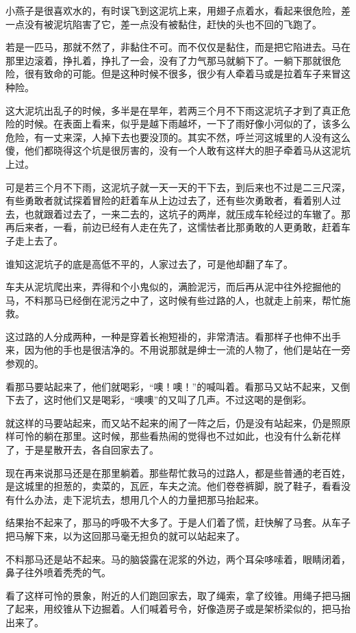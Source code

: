 \par 小燕子是很喜欢水的，有时误飞到这泥坑上来，用翅子点着水，看起来很危险，差一点没有被泥坑陷害了它，差一点没有被黏住，赶快的头也不回的飞跑了。
\par 若是一匹马，那就不然了，非黏住不可。而不仅仅是黏住，而是把它陷进去。马在那里边滚着，挣扎着，挣扎了一会，没有了力气那马就躺下了。一躺下那就很危险，很有致命的可能。但是这种时候不很多，很少有人牵着马或是拉着车子来冒这种险。
\par 这大泥坑出乱子的时候，多半是在旱年，若两三个月不下雨这泥坑子才到了真正危险的时候。在表面上看来，似乎是越下雨越坏，一下了雨好像小河似的了，该多么危险，有一丈来深，人掉下去也要没顶的。其实不然，呼兰河这城里的人没有这么傻，他们都晓得这个坑是很厉害的，没有一个人敢有这样大的胆子牵着马从这泥坑上过。
\par 可是若三个月不下雨，这泥坑子就一天一天的干下去，到后来也不过是二三尺深，有些勇敢者就试探着冒险的赶着车从上边过去了，还有些次勇敢者，看着别人过去，也就跟着过去了，一来二去的，这坑子的两岸，就压成车轮经过的车辙了。那再后来者，一看，前边已经有人走在先了，这懦怯者比那勇敢的人更勇敢，赶着车子走上去了。
\par 谁知这泥坑子的底是高低不平的，人家过去了，可是他却翻了车了。
\par 车夫从泥坑爬出来，弄得和个小鬼似的，满脸泥污，而后再从泥中往外挖掘他的马，不料那马已经倒在泥污之中了，这时候有些过路的人，也就走上前来，帮忙施救。
\par 这过路的人分成两种，一种是穿着长袍短褂的，非常清洁。看那样子也伸不出手来，因为他的手也是很洁净的。不用说那就是绅士一流的人物了，他们是站在一旁参观的。
\par 看那马要站起来了，他们就喝彩，“噢！噢！”的喊叫着。看那马又站不起来，又倒下去了，这时他们又是喝彩，“噢噢”的又叫了几声。不过这喝的是倒彩。
\par 就这样的马要站起来，而又站不起来的闹了一阵之后，仍是没有站起来，仍是照原样可怜的躺在那里。这时候，那些看热闹的觉得也不过如此，也没有什么新花样了，于是星散开去，各自回家去了。
\par 现在再来说那马还是在那里躺着。那些帮忙救马的过路人，都是些普通的老百姓，是这城里的担葱的，卖菜的，瓦匠，车夫之流。他们卷卷裤脚，脱了鞋子，看看没有什么办法，走下泥坑去，想用几个人的力量把那马抬起来。
\par 结果抬不起来了，那马的呼吸不大多了。于是人们着了慌，赶快解了马套。从车子把马解下来，以为这回那马毫无担负的就可以站起来了。
\par 不料那马还是站不起来。马的脑袋露在泥浆的外边，两个耳朵哆嗦着，眼睛闭着，鼻子往外喷着秃秃的气。
\par 看了这样可怜的景象，附近的人们跑回家去，取了绳索，拿了绞锥。用绳子把马捆了起来，用绞锥从下边掘着。人们喊着号令，好像造房子或是架桥梁似的，把马抬出来了。
